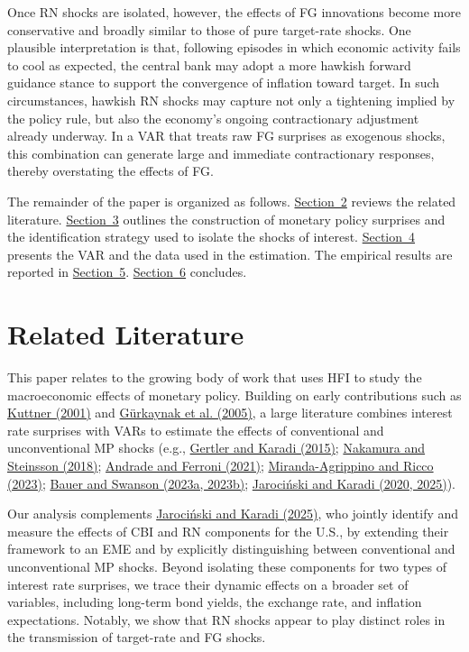 \documentclass[12pt, reqno]{article}
\begin{document}
Once RN shocks are isolated, however, the effects of FG innovations become more conservative and broadly similar to those of pure target-rate shocks. One plausible interpretation is that, following episodes in which economic activity fails to cool as expected, the central bank may adopt a more hawkish forward guidance stance to support the convergence of inflation toward target. In such circumstances, hawkish RN shocks may capture not only a tightening implied by the policy rule, but also the economy’s ongoing contractionary adjustment already underway. In a VAR that treats raw FG surprises as exogenous shocks, this combination can generate large and immediate contractionary responses, thereby overstating the effects of FG.

The remainder of the paper is organized as follows. \hyperlink{Section 2}{Section~2} reviews the related literature. \hyperlink{Section 3}{Section~3} outlines the construction of monetary policy surprises and the identification strategy used to isolate the shocks of interest. \hyperlink{Section 4}{Section~4} presents the VAR and the data used in the estimation. The empirical results are reported in \hyperlink{Section 5}{Section~5}. \hyperlink{Section 6}{Section~6} concludes.


\section{Related Literature}

This paper relates to the growing body of work that uses HFI to study the macroeconomic effects of monetary policy. Building on early contributions such as \hyperlink{Kuttner (2001)}{Kuttner (2001)} and \hyperlink{Gürkaynak et al. (2005)}{Gürkaynak et al. (2005)}, a large literature combines interest rate surprises with VARs  to estimate the effects of conventional and unconventional MP shocks (e.g., \hyperlink{Gertler and Karadi (2015)}{Gertler and Karadi (2015)}; \hyperlink{Nakamura and Steinsson (2018)}{Nakamura and Steinsson (2018)}; \hyperlink{Andrade and Ferroni (2021)}{Andrade and Ferroni (2021)}; \hyperlink{Miranda-Agrippino and Ricco (2023)}{Miranda-Agrippino and Ricco (2023)}; \hyperlink{Bauer and Swanson (2023a, 2023b)}{Bauer and Swanson (2023a, 2023b)}; \hyperlink{Jarociński and Karadi (2020, 2025)}{Jarociński and Karadi (2020, 2025)}).

Our analysis complements \hyperlink{Jarociński and Karadi (2025)}{Jarociński and Karadi (2025)}, who jointly identify and measure the effects of CBI and RN  components for the U.S., by extending their framework to an EME and by explicitly distinguishing between conventional and unconventional MP shocks. Beyond isolating these components for two types of interest rate surprises, we trace their dynamic effects on a broader set of variables, including long-term bond yields, the exchange rate, and inflation expectations. Notably, we show that RN shocks appear to play distinct roles in the transmission of target-rate and FG shocks.
\end{document}
